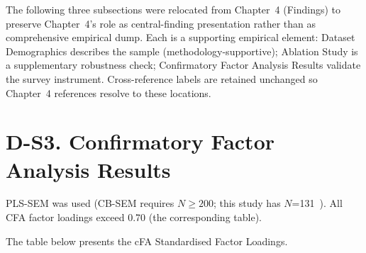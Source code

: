 \noindent The following three subsections were relocated from Chapter~4
(Findings) to preserve Chapter~4's role as central-finding presentation
rather than as comprehensive empirical dump. Each is a supporting empirical
element: Dataset Demographics describes the sample (methodology-supportive);
Ablation Study is a supplementary robustness check; Confirmatory Factor
Analysis Results validate the survey instrument. Cross-reference labels
are retained unchanged so Chapter~4 references resolve to these locations.


\section*{D-S3. Confirmatory Factor Analysis Results}
\label{sec:appd_cfa_results}

PLS-SEM was used (CB-SEM requires $N \geq 200$; this study has $N$=131~\cite{hair2019multivariate}). All CFA factor loadings exceed 0.70 (the corresponding table).

\noindent The table below presents the cFA Standardised Factor Loadings.

